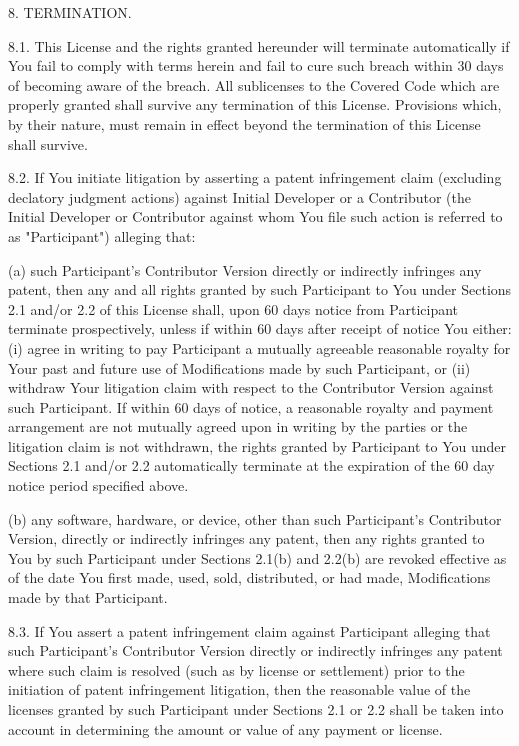 \begin{DoxyCode}
8. TERMINATION.

     8.1.  This License and the rights granted hereunder will terminate
     automatically if You fail to comply with terms herein and fail to cure
     such breach within 30 days of becoming aware of the breach. All
     sublicenses to the Covered Code which are properly granted shall
     survive any termination of this License. Provisions which, by their
     nature, must remain in effect beyond the termination of this License
     shall survive.

     8.2.  If You initiate litigation by asserting a patent infringement
     claim (excluding declatory judgment actions) against Initial Developer
     or a Contributor (the Initial Developer or Contributor against whom
     You file such action is referred to as "Participant")  alleging that:

     (a)  such Participant's Contributor Version directly or indirectly
     infringes any patent, then any and all rights granted by such
     Participant to You under Sections 2.1 and/or 2.2 of this License
     shall, upon 60 days notice from Participant terminate prospectively,
     unless if within 60 days after receipt of notice You either: (i)
     agree in writing to pay Participant a mutually agreeable reasonable
     royalty for Your past and future use of Modifications made by such
     Participant, or (ii) withdraw Your litigation claim with respect to
     the Contributor Version against such Participant.  If within 60 days
     of notice, a reasonable royalty and payment arrangement are not
     mutually agreed upon in writing by the parties or the litigation claim
     is not withdrawn, the rights granted by Participant to You under
     Sections 2.1 and/or 2.2 automatically terminate at the expiration of
     the 60 day notice period specified above.

     (b)  any software, hardware, or device, other than such Participant's
     Contributor Version, directly or indirectly infringes any patent, then
     any rights granted to You by such Participant under Sections 2.1(b)
     and 2.2(b) are revoked effective as of the date You first made, used,
     sold, distributed, or had made, Modifications made by that
     Participant.

     8.3.  If You assert a patent infringement claim against Participant
     alleging that such Participant's Contributor Version directly or
     indirectly infringes any patent where such claim is resolved (such as
     by license or settlement) prior to the initiation of patent
     infringement litigation, then the reasonable value of the licenses
     granted by such Participant under Sections 2.1 or 2.2 shall be taken
     into account in determining the amount or value of any payment or
     license.


\end{DoxyCode}
